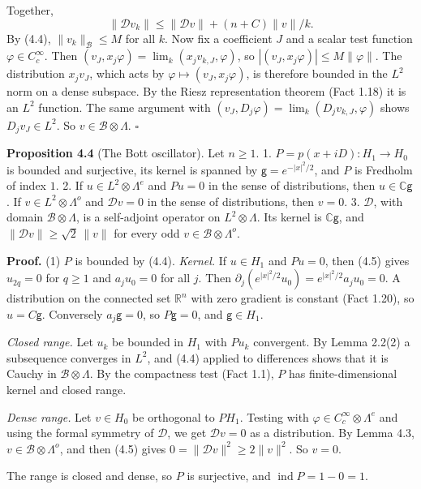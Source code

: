 \documentclass[
  11pt,
]{article}
\begin{document}
Together, \[
\|\mathcal Dv_k\|\le\|\mathcal Dv\|+(n+C)\|v\|/k .
\] By (4.4), \(\|v_k\|_{\mathcal B}\le M\) for all \(k\). Now fix a
coefficient \(J\) and a scalar test function \(\varphi\in C_c^\infty\).
Then \((v_J,x_j\varphi)=\lim_k(x_jv_{k,J},\varphi)\), so
\(|(v_J,x_j\varphi)|\le M\|\varphi\|\). The distribution \(x_jv_J\),
which acts by \(\varphi\mapsto(v_J,x_j\varphi)\), is therefore bounded
in the \(L^2\) norm on a dense subspace. By the Riesz representation
theorem (Fact 1.18) it is an \(L^2\) function. The same argument with
\((v_J,D_j\varphi)=\lim_k(D_jv_{k,J},\varphi)\) shows \(D_jv_J\in L^2\).
So \(v\in\mathcal B\otimes\Lambda\). \(\square\)

\textbf{Proposition 4.4} (The Bott oscillator). Let \(n\ge1\). 1.
\(P=p(x+iD):H_1\to H_0\) is bounded and surjective, its kernel is
spanned by \(\mathsf g=e^{-|x|^2/2}\), and \(P\) is Fredholm of index
\(1\). 2. If \(u\in L^2\otimes\Lambda^e\) and \(Pu=0\) in the sense of
distributions, then \(u\in\mathbb C\mathsf g\). If
\(v\in L^2\otimes\Lambda^o\) and \(\mathcal Dv=0\) in the sense of
distributions, then \(v=0\). 3. \(\mathcal D\), with domain
\(\mathcal B\otimes\Lambda\), is a self-adjoint operator on
\(L^2\otimes\Lambda\). Its kernel is \(\mathbb C\mathsf g\), and
\(\|\mathcal Dv\|\ge\sqrt2\,\|v\|\) for every odd
\(v\in\mathcal B\otimes\Lambda^o\).

\textbf{Proof.} (1) \(P\) is bounded by (4.4). \emph{Kernel.} If
\(u\in H_1\) and \(Pu=0\), then (4.5) gives \(u_{2q}=0\) for \(q\ge1\)
and \(a_ju_0=0\) for all \(j\). Then
\(\partial_j(e^{|x|^2/2}u_0)=e^{|x|^2/2}a_ju_0=0\). A distribution on
the connected set \(\mathbb R^n\) with zero gradient is constant (Fact
1.20), so \(u=C\mathsf g\). Conversely \(a_j\mathsf g=0\), so
\(P\mathsf g=0\), and \(\mathsf g\in H_1\).

\emph{Closed range.} Let \(u_k\) be bounded in \(H_1\) with \(Pu_k\)
convergent. By Lemma 2.2(2) a subsequence converges in \(L^2\), and
(4.4) applied to differences shows that it is Cauchy in
\(\mathcal B\otimes\Lambda\). By the compactness test (Fact 1.1), \(P\)
has finite-dimensional kernel and closed range.

\emph{Dense range.} Let \(v\in H_0\) be orthogonal to \(PH_1\). Testing
with \(\varphi\in C_c^\infty\otimes\Lambda^e\) and using the formal
symmetry of \(\mathcal D\), we get \(\mathcal Dv=0\) as a distribution.
By Lemma 4.3, \(v\in\mathcal B\otimes\Lambda^o\), and then (4.5) gives
\(0=\|\mathcal Dv\|^2\ge2\|v\|^2\). So \(v=0\).

The range is closed and dense, so \(P\) is surjective, and
\(\operatorname{ind}P=1-0=1\).
\end{document}
